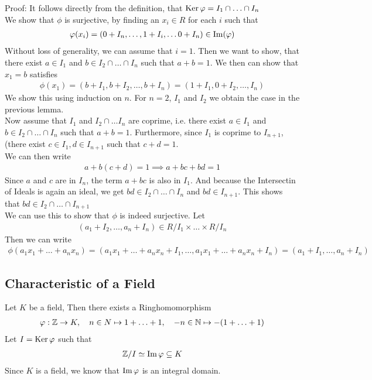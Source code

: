 Proof: It follows directly from the definition, that $\operatorname{Ker} \varphi = I_1 \cap \ldots \cap I_n$\\
We show that $\phi$ is surjective, by finding an $x_i \in R$ for each $i$ such that
\begin{align*}
	\varphi(x_i) = (0 + I_n, \ldots, 1 + I_i, \ldots 0 + I_n) \in \operatorname{Im} (\varphi)
\end{align*}
Without loss of generality, we can assume that $i = 1$. Then we want to show, that there exist $a \in I_1$ and $b \in I_2 \cap \ldots \cap I_n$ such that $a + b = 1$. We then can show that $x_1 = b$ satisfies
\begin{align*}
	\phi(x_1) = (b + I_1, b + I_2, \ldots, b + I_n) = (1 + I_1, 0 + I_2, \ldots, I_n)
\end{align*}
We show this using induction on $n$. For $n = 2$, $I_1$ and $I_2$ we obtain the case in the previous lemma.\\
Now assume that $I_1$ and $I_2 \cap \ldots I_{n}$ are coprime, i.e. there exist $a \in I_1$ and $b \in I_2 \cap \ldots \cap I_{n}$ such that $a + b = 1$. Furthermore, since $I_1$ is coprime to $I_{n+1}$, (there exist $c \in I_1, d \in I_{n+1}$ such that $c + d = 1$.\\
We can then write
\begin{align*}
	a + b(c+d) = 1 \implies a + bc + bd = 1
\end{align*}
Since $a$ and $c$ are in $I_n$, the term $a + bc$ is also in $I_1$. And because the Intersectin of Ideals is again an ideal, we get $bd \in I_2 \cap \ldots \cap I_n$ and $bd \in I_{n+1}$. This shows that $bd \in I_2 \cap \ldots \cap I_{n+1}$\\
We can use this to show that $\phi$ is indeed surjective. Let 
\begin{align*}
	(a_1 + I_2, \ldots, a_n + I_n) \in R/I_{1} \times \ldots \times R/I_{n}
\end{align*}
Then we can write
\begin{align*}
	\phi(a_1x_1 + \ldots + a_nx_n) = (a_1x_1 + \ldots + a_n x_n + I_1, \ldots, a_1x_1 + \ldots + a_nx_n + I_n) = (a_1 + I_1, \ldots, a_n + I_n)
\end{align*}

\subsection{Characteristic of a Field}

Let $K$ be a field, Then there exists a Ringhomomorphism 
\begin{align*}
	\varphi: \mathbb{Z} \to K, \quad n \in N \mapsto 1 + \ldots + 1, \quad -n \in \mathbb{N} \mapsto -(1 + \ldots + 1)
\end{align*}
Let $I = \operatorname{Ker} \varphi$ such that
\begin{align*}
\mathbb{Z}/I \simeq \operatorname{Im} \varphi \subseteq K
\end{align*}
Since $K$ is a field, we know that $\operatorname{Im} \varphi$ is an integral domain.\\

